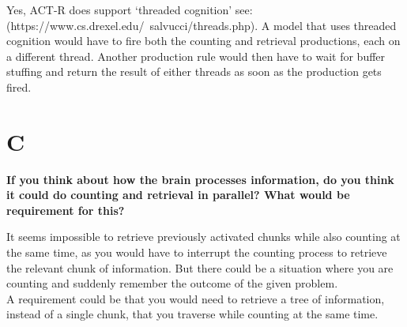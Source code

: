 \documentclass[11pt,a4paper,titlepage]{article}
\begin{document}
Yes, ACT-R does support `threaded cognition' see:\\
(https://www.cs.drexel.edu/~salvucci/threads.php).  A model that uses
threaded cognition would have to fire both the counting and retrieval
productions, each on a different thread. Another production rule would
then have to wait for buffer stuffing and return the result of either
threads as soon as the production gets fired.

\section{C}
\textbf{If you think about how the brain processes information, do you think
it could do counting and retrieval in parallel? What would be
requirement for this?}

It seems impossible to retrieve previously activated chunks while also
counting at the same time, as you would have to interrupt the counting
process to retrieve the relevant chunk of information. But there could
be a situation where you are counting and suddenly remember the
outcome of the given problem.  \\
A requirement could be that you would need to retrieve a tree of
information, instead of a single chunk, that you traverse while
counting at the same time.
\end{document}
